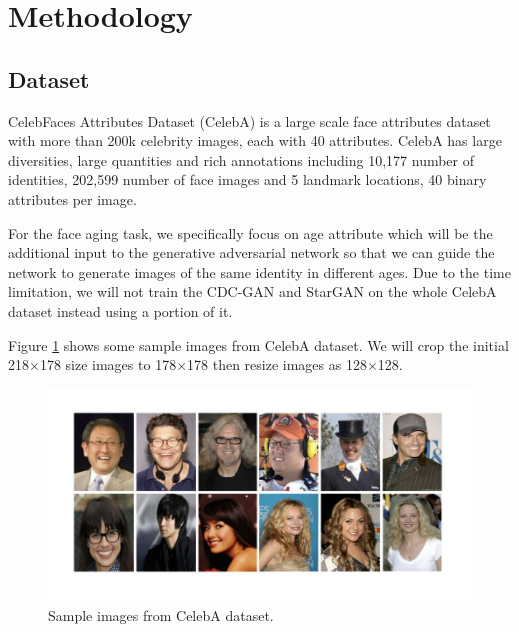 \documentclass{article}
\begin{document}
\section{Methodology}
\subsection{Dataset}
CelebFaces Attributes Dataset (CelebA) \cite{liu2015faceattributes} is a large scale face attributes dataset with more than 200k celebrity images, each with 40 attributes. CelebA has large diversities, large quantities and rich annotations including 10,177 number of identities, 202,599 number of face images and 5 landmark locations, 40 binary attributes per image.

For the face aging task, we specifically focus on age attribute which will be the additional input to the generative adversarial network so that we can guide the network to generate images of the same identity in different ages. Due to the time limitation, we will not train the CDC-GAN and StarGAN on the whole CelebA dataset instead using a portion of it.

Figure \ref{data sample} shows some sample images from CelebA dataset. We will crop the initial 218$\times$178 size images to 178$\times$178 then resize images as 128$\times$128.

\begin{figure}[H]
\begin{center}
  \centering
  \includegraphics[width=5in]{image/data_sample.png}
\end{center}
\caption{Sample images from CelebA dataset.}
\label{data sample}
\end{figure}
\end{document}
